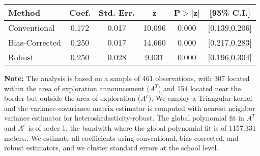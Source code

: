 \begin{table}[htbp]\centering
 \footnotesize 
\begin{tabular}{lccccc}
\hline\hline
Method & Coef. & Std. Err. & z & P$>|$z$|$ & [95\% C.I.] \\ 
\hline \hline  
Conventional & 0.172 & 0.017 & 10.096 & 0.000 & [0.139,0.206] \\ 
 Bias-Corrected & 0.250 & 0.017 & 14.660 & 0.000 & [0.217,0.283] \\ 
Robust & 0.250 & 0.028 & 9.031 & 0.000 & [0.196,0.304] \\ 
  \hline\hline
\end{tabular}
\label{table:rd}
\begin{tablenotes} 
  \justifying \tiny \textbf{Note: }    
   The analysis is based on a sample of 461 observations, with 307 located within the area of exploration announcement ($A^{T}$) and 154 located near the border but outside the area of exploration  ($A^{c}$). 
           We employ a Triangular kernel and the variance-covariance matrix estimator is computed with nearest neighbor variance estimator for heteroskedasticity-robust. The global polynomial fit in  $A^{T}$ and $A^{c}$ is of order 1, the bandwith where the global polynomial fit is of 1157.331 meters.. We estimate all coefficients using conventional, bias-corrected, and robust estimators, and we cluster standard errors at the school level. \end{tablenotes} 
 \end{table} 
